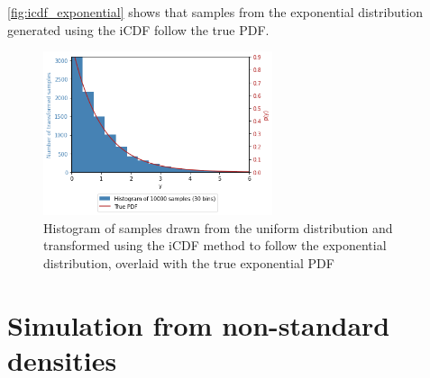 \documentclass[a4paper]{article}
\begin{document}
\autoref{fig:icdf_exponential} shows that samples from the exponential distribution generated using the iCDF follow the
true PDF.

\begin{figure}[h]
\centering
\includegraphics[width=0.6\textwidth]{figures/icdf_exponential.png}
\caption{Histogram of samples drawn from the uniform distribution and transformed using the iCDF method to follow the
exponential distribution, overlaid with the true exponential PDF}
\label{fig:icdf_exponential}
\end{figure}



\section{Simulation from non-standard densities}
\end{document}
